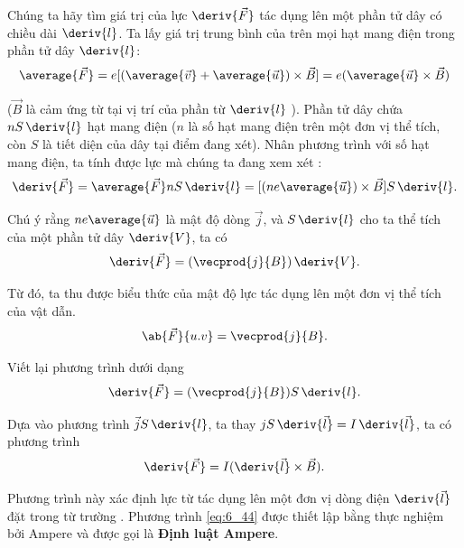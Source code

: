 Chúng ta hãy tìm giá trị của lực $\deriv{\vec{F}}$ tác dụng lên một phần tử dây có chiều dài $\deriv{l}$. Ta lấy giá trị trung bình của  trên mọi hạt mang điện trong phần tử dây $\deriv{l}$:
\begin{equation}\label{eq:6_41}
    \average{\vec{F}} = e [(\average{\vec{v}} + \average{\vec{u}}) \times \vec{B}] = e (\average{\vec{u}} \times \vec{B})
\end{equation}

\noindent
($\vec{B}$ là cảm ứng từ tại vị trí của phần từ $\deriv{l}$ ). Phần tử dây chứa $nS\,\deriv{l}$ hạt mang điện ($n$ là số hạt mang điện trên một đơn vị thể tích, còn $S$ là tiết diện của dây tại điểm đang xét). Nhân phương trình  với số hạt mang điện, ta tính được lực mà chúng ta đang xem xét :
\begin{equation*}
    \deriv{\vec{F}} = \average{\vec{F}} n S\, \deriv{l} = [(ne\average{\vec{u}}) \times \vec{B}] S\, \deriv{l}.
\end{equation*}

\noindent
 Chú ý rằng $ne\average{\vec{u}}$ là mật độ dòng $\vec{j}$, và $S\,\deriv{l}$ cho ta thể tích của một phần tử dây $\deriv{V}$, ta có
\begin{equation}\label{eq:6_42}
    \deriv{\vec{F}} = (\vecprod{j}{B})\, \deriv{V}.
\end{equation}

\noindent
Từ đó, ta thu được biểu thức của mật độ lực tác dụng lên một đơn vị thể tích của vật dẫn.
\begin{equation}\label{eq:6_43}
    \ab{\vec{F}}{u.v} = \vecprod{j}{B}.
\end{equation}

Viết lại phương trình  dưới dạng
\begin{equation*}
    \deriv{\vec{F}} = (\vecprod{j}{B}) S\, \deriv{l}.
\end{equation*}

\noindent
Dựa vào phương trình  $\vec{j}S\,\deriv{l}$, ta thay $jS\,\deriv{\vec{l}}= I\,\deriv{\vec{l}}$, ta có phương trình
\begin{equation}\label{eq:6_44}
    \deriv{\vec{F}} = I (\deriv{\vec{l}} \times \vec{B}).
\end{equation}

\noindent
 Phương trình này xác định lực từ tác dụng lên một đơn vị dòng điện   $\deriv{\vec{l}}$ đặt trong từ trường . Phương trình \eqref{eq:6_44} được thiết lập bằng thực nghiệm bởi Ampere và được gọi là \textbf{ Định luật Ampere}.

